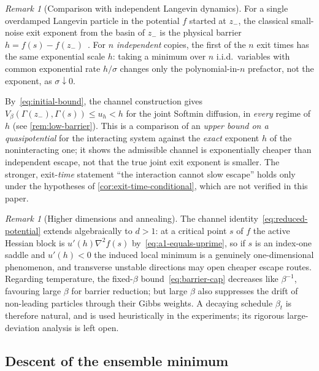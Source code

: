 \documentclass{article}
\theoremstyle{plain}
\theoremstyle{definition}
\theoremstyle{remark}
\newtheorem{remark}[theorem]{Remark}
\begin{document}
\begin{remark}[Comparison with independent Langevin dynamics]
\label{rem:comparison}
For a single overdamped Langevin particle in the potential \(f\) started at \(z_-\), the classical small-noise exit exponent from the basin of \(z_-\) is the physical barrier \(h=f(s)-f(z_-)\)~\cite{freidlin2012random}. For \(n\) \emph{independent} copies, the first of the \(n\) exit times has the same exponential scale \(h\): taking a minimum over \(n\) i.i.d.\ variables with common exponential rate \(h/\sigma\) changes only the polynomial-in-\(n\) prefactor, not the exponent, as \(\sigma\downarrow0\).
 
By~\eqref{eq:initial-bound}, the channel construction gives \(V_\beta(\Gamma(z_-),\Gamma(s))\le u_h<h\) for the joint Softmin diffusion, in \emph{every} regime of \(h\) (see \ref{rem:low-barrier}). This is a comparison of an \emph{upper bound on a quasipotential} for the interacting system against the \emph{exact} exponent \(h\) of the noninteracting one; it shows the admissible channel is exponentially cheaper than independent escape, not that the true joint exit exponent is smaller. The stronger, exit-\emph{time} statement ``the interaction cannot slow escape'' holds only under the hypotheses of \ref{cor:exit-time-conditional}, which are not verified in this paper.
\end{remark}
 
\begin{remark}[Higher dimensions and annealing]
\label{rem:higher-dim}
The channel identity~\eqref{eq:reduced-potential} extends algebraically to \(d>1\): at a critical point \(s\) of \(f\) the active Hessian block is \(u'(h)\nabla^2 f(s)\) by~\eqref{eq:a1-equals-uprime}, so if \(s\) is an index-one saddle and \(u'(h)<0\) the induced local minimum is a genuinely one-dimensional phenomenon, and transverse unstable directions may open cheaper escape routes. Regarding temperature, the fixed-\(\beta\) bound~\eqref{eq:barrier-cap} decreases like \(\beta^{-1}\), favouring large \(\beta\) for barrier reduction; but large \(\beta\) also suppresses the drift of non-leading particles through their Gibbs weights. A decaying schedule \(\beta_t\) is therefore natural, and is used heuristically in the experiments; its rigorous large-deviation analysis is left open.
\end{remark}
\subsection{Descent of the ensemble minimum}
\label{sec:convergence-rate}
\end{document}
